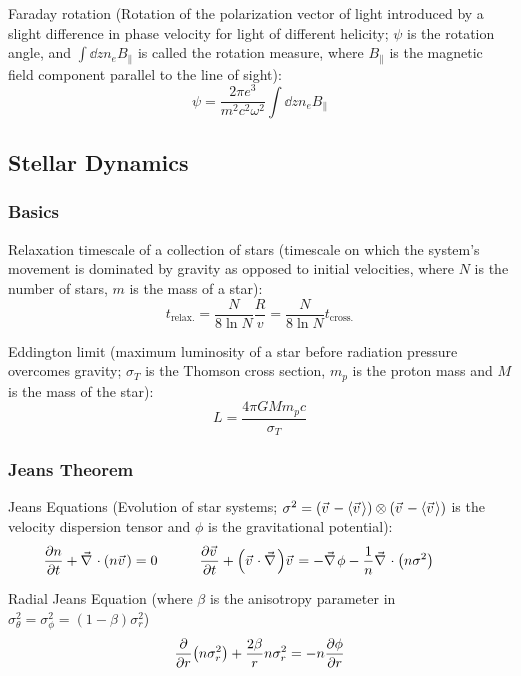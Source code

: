 			\noindent
			Faraday rotation (Rotation of the polarization vector of light introduced by a slight difference in phase velocity for light of different helicity; $\psi$ is the rotation angle, and $\int \dd{z} n_e B_\parallel$ is called the rotation measure, where $B_\parallel$ is the magnetic field component parallel to the line of sight):
			\begin{equation}
				\psi = \frac{2\pi e^3}{m^2 c^2 \omega^2} \int \dd{z} n_e B_\parallel
			\end{equation}

	\subsection{Stellar Dynamics}
		\subsubsection{Basics}
			Relaxation timescale of a collection of stars (timescale on which the system's movement is dominated by gravity as opposed to initial velocities, where $N$ is the number of stars, $m$ is the mass of a star):
			\begin{equation}
				t_{\text{relax.}} = \frac{N}{8\ln N} \frac{R}{v} = \frac{N}{8\ln N} t_{\text{cross.}}
			\end{equation}

			Eddington limit (maximum luminosity of a star before radiation pressure overcomes gravity; $\sigma_T$ is the Thomson cross section, $m_p$ is the proton mass and $M$ is the mass of the star):
			\begin{equation}
				L = \frac{4 \pi G M m_p c}{\sigma_T}
			\end{equation}


		\subsubsection{Jeans Theorem}
			Jeans Equations (Evolution of star systems; $\sigma^2 = \qty(\vec{v}-\avg{\vec{v}})\otimes\qty(\vec{v}-\avg{\vec{v}})$ is the velocity dispersion tensor and $\phi$ is the gravitational potential):
			\begin{equation}
				\pdv{n}{t} + \Nabla\cdot\qty(n\vec{v}) = 0 \hsp
				\pdv{\vec{v}}{t} + \qty(\vec{v}\cdot\Nabla)\vec{v} = -\Nabla\phi -\frac{1}{n}\Nabla\cdot\qty(n\sigma^2) \hsp
			\end{equation}

			\noindent
			Radial Jeans Equation (where $\beta$ is the anisotropy parameter in $\sigma_\theta^2 = \sigma_\phi^2 = (1-\beta) \sigma_r^2$)
			\begin{equation}
				\pdv{r} \qty(n\sigma_r^2) + \frac{2\beta}{r} n\sigma_r^2 = -n\pdv{\phi}{r}
			\end{equation}


